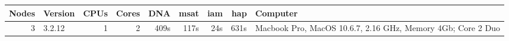 \documentclass[landscape]{foils}
\begin{document}
\begin{tabular}{r l r r r r r r p{5cm} }
Nodes &  Version & CPUs & Cores & DNA & msat & iam & hap & Computer\\
\hline
3 & 3.2.12 & 1 & 2 & 409s & 117s & 24s & 631s & {Macbook Pro, MacOS 10.6.7, 2.16 GHz, Memory 4Gb; Core 2 Duo} \\
\end{tabular}
\end{document}
